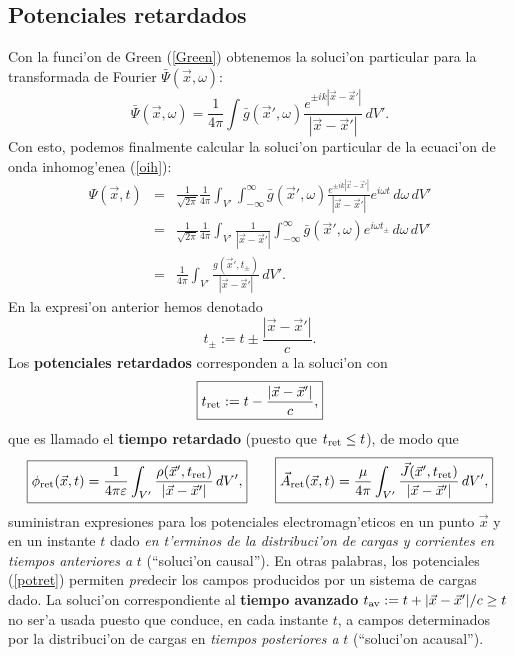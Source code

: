 \subsection{Potenciales retardados}
Con la funci'on de Green (\ref{Green}) obtenemos la soluci'on particular para la
transformada de Fourier $\bar{\Psi}(\vec{x},\omega)$:
\begin{equation}
\bar{\Psi}(\vec{x},\omega)=\frac{1}{4\pi}\int
\bar{g}(\vec{x}',\omega)\frac{e^{\pm
ik|\vec{x}-\vec{x}'|}}{|\vec{x}-\vec{x}'|}\,dV' .
\end{equation}
Con esto, podemos finalmente calcular la soluci'on particular de la ecuaci'on de
onda inhomog'enea (\ref{oih}):
\begin{eqnarray}
\Psi(\vec{x},t)&=&\frac{1}{\sqrt{2\pi}}\frac{1}{4\pi}\int_{V'}\int_{-\infty}
^\infty \bar{g}(\vec{x}',\omega)\frac{e^{\pm
ik|\vec{x}-\vec{x}'|}}{|\vec{x}-\vec{x}'|}e^{i\omega t}\,d\omega\,dV'  \\
&=&\frac{1}{\sqrt{2\pi}}\frac{1}{4\pi}\int_{V'}\frac{1}{|\vec{x}-\vec{x}'|}\int_
{-\infty}^\infty \bar{g}(\vec{x}',\omega)e^{i\omega t_{\pm}}\,d\omega \,dV' \\
&=&\frac{1}{4\pi}\int_{V'} \frac{g(\vec{x}',t_{\pm})}{|\vec{x}-\vec{x}'|}\,dV' .
\end{eqnarray}
En la expresi'on anterior hemos denotado
\begin{equation}
t_{\pm}:=t\pm \frac{|\vec{x}-\vec{x}'|}{c}.
\end{equation}
Los \textbf{potenciales retardados} corresponden a la soluci'on con
\begin{equation}
\boxed{t_{\rm ret}:=t-\frac{|\vec{x}-\vec{x}'|}{c},} \label{deftret}
\end{equation}
que es llamado el \textbf{tiempo retardado} (puesto que $t_{\rm ret}\le t$), de modo que
\begin{equation}
\boxed{\phi_{\rm ret}(\vec{x},t)=\frac{1}{4\pi\varepsilon}\int_{V'}
\frac{\rho(\vec{x}',t_{\rm ret})}{|\vec{x}-\vec{x}'|}\,dV',} \qquad \boxed{\vec{A}_{\rm
ret}(\vec{x},t)=\frac{\mu}{4\pi}\int_{V'}
\frac{\vec{J}(\vec{x}',t_{\rm ret})}{|\vec{x}-\vec{x}'|}\,dV' ,} \label{potret}
\end{equation}
suministran expresiones para los potenciales electromagn'eticos en un punto
$\vec{x}$ y en un instante $t$ dado \textit{en t'erminos de la distribuci'on de cargas y corrientes en tiempos anteriores a} $t$ (``soluci'on causal''). En otras palabras, los potenciales (\ref{potret}) permiten \textit{pre}decir los campos producidos por un sistema de cargas dado. La soluci'on correspondiente al \textbf{tiempo avanzado} $t_{\rm av}:=t+{|\vec{x}-\vec{x}'|}/{c}\ge t$ no ser'a usada puesto que conduce, en cada instante $t$, a campos determinados por la distribuci'on de cargas en \textit{tiempos posteriores a }$t$ (``soluci'on acausal'').

